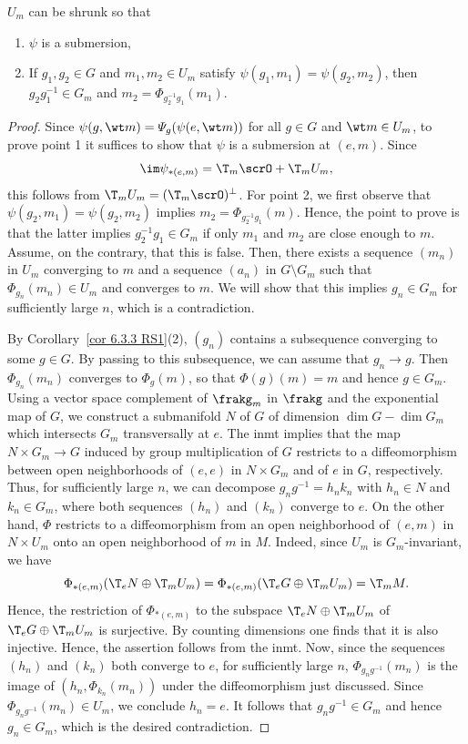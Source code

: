 \begin{lem}[{{\cite[Lem.~6.4.5]{RS1}}}]\label{lem 6.4.5 RS1}
    $U_m$ can be shrunk so that
    \begin{enumerate}
        \item $\psi$ is a submersion,
        \item If $g_1,g_2\in G$ and $m_1,m_2\in U_m$ satisfy $\psi(g_1,m_1)=\psi(g_2,m_2)$, then $g_2g_1^{-1}\in G_m$ and $m_2=\Phi_{g_2^{-1}g_1}(m_1)$.
    \end{enumerate}
\end{lem}
\begin{proof}
    Since $\psi(g,\wt m)=\varPsi_g(\psi(e,\wt m))$ for all $g\in G$ and $\wt m\in U_m$, to prove point 1 it suffices to show that $\psi$ is a submersion at $(e,m)$. Since 
    \[\im \psi_{\ast(e,m)}=\T_m \scrO+\T_m U_m,\]
    this follows from $\T_m U_m=(\T_m \scrO)^\perp$. For point 2, we first observe that $\psi(g_2,m_1)=\psi(g_2,m_2)$ implies $m_2=\Phi_{g_2^{-1}g_1}(m)$. Hence, the point to prove is that the latter implies $g_2^{-1}g_1\in G_m$ if only $m_1$ and $m_2$ are close enough to $m$. Assume, on the contrary, that this is false. Then, there exists a sequence $(m_n)$ in $U_m$ converging to $m$ and a sequence $(a_n)$ in $G\setminus G_m$ such that $\Phi_{g_n}(m_n)\in U_m$ and converges to $m$. We will show that this implies $g_n\in G_m$ for sufficiently large $n$, which is a contradiction.

    By Corollary~\ref{cor 6.3.3 RS1}(2), $(g_n)$ contains a subsequence converging to some $g\in G$. By passing to this subsequence, we can assume that $g_n\to g$. Then $\Phi_{g_n}(m_n)$ converges to $\Phi_g(m)$, so that $\Phi(g)(m)=m$ and hence $g\in G_m$. Using a vector space complement of $\frakg_m$ in $\frakg$ and the exponential map of $G$, we construct a submanifold $N$ of $G$ of dimension $\dim G-\dim G_m$ which intersects $G_m$ transversally at $e$. The \gls{inmt} implies that the map $N\times G_m\to G$ induced by group multiplication of $G$ restricts to a diffeomorphism between open neighborhoods of $(e,e)$ in $N\times G_m$ and of $e$ in $G$, respectively. Thus, for sufficiently large $n$, we can decompose $g_n g^{-1}=h_nk_n$ with $h_n\in N$ and $k_n\in G_m$, where both sequences $(h_n)$ and $(k_n)$ converge to $e$. On the other hand, $\Phi$ restricts to a diffeomorphism from an open neighborhood of $(e,m)$ in $N\times U_m$ onto an open neighborhood of $m$ in $M$. Indeed, since $U_m$ is $G_m$-invariant, we have 
    \[\Phi_{\ast (e,m)}(\T_e N\oplus\T_m U_m)=\Phi_{\ast (e,m)}(\T_e G\oplus \T_m U_m)=\T_m M.\]
    Hence, the restriction of $\Phi_{\ast (e,m)}$ to the subspace $\T_e N\oplus \T_m U_m$ of $\T_e G\oplus \T_m U_m$ is surjective. By counting dimensions one finds that it is also injective. Hence, the assertion follows from the \gls{inmt}. Now, since the sequences $(h_n)$ and $(k_n)$ both converge to $e$, for sufficiently large $n$, $\Phi_{g_ng^{-1}}(m_n)$ is the image of $(h_n,\Phi_{k_n}(m_n))$ under the diffeomorphism just discussed. Since $\Phi_{g_ng^{-1}}(m_n)\in U_m$, we conclude $h_n=e$. It follows that $g_ng^{-1}\in G_m$ and hence $g_n\in G_m$, which is the desired contradiction.
\end{proof}


